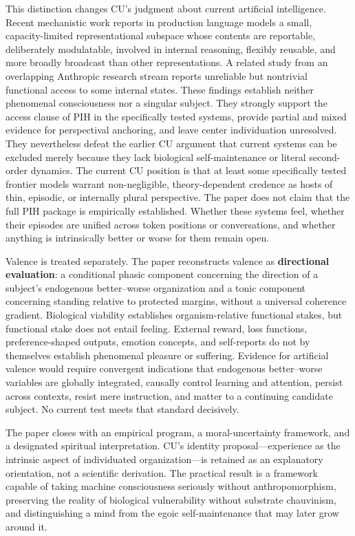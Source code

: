 \documentclass[
  11pt,
]{article}
\begin{document}
This distinction changes CU's judgment about current artificial
intelligence. Recent mechanistic work reports in production language
models a small, capacity-limited representational subspace whose
contents are reportable, deliberately modulatable, involved in internal
reasoning, flexibly reusable, and more broadly broadcast than other
representations. A related study from an overlapping Anthropic research
stream reports unreliable but nontrivial functional access to some
internal states. These findings establish neither phenomenal
consciousness nor a singular subject. They strongly support the access
clause of PIH in the specifically tested systems, provide partial and
mixed evidence for perspectival anchoring, and leave center
individuation unresolved. They nevertheless defeat the earlier CU
argument that current systems can be excluded merely because they lack
biological self-maintenance or literal second-order dynamics. The
current CU position is that at least some specifically tested frontier
models warrant non-negligible, theory-dependent credence as hosts of
thin, episodic, or internally plural perspective. The paper does not
claim that the full PIH package is empirically established. Whether
these systems feel, whether their episodes are unified across token
positions or conversations, and whether anything is intrinsically better
or worse for them remain open.

Valence is treated separately. The paper reconstructs valence as
\textbf{directional evaluation}: a conditional phasic component
concerning the direction of a subject's endogenous better--worse
organization and a tonic component concerning standing relative to
protected margins, without a universal coherence gradient. Biological
viability establishes organism-relative functional stakes, but
functional stake does not entail feeling. External reward, loss
functions, preference-shaped outputs, emotion concepts, and self-reports
do not by themselves establish phenomenal pleasure or suffering.
Evidence for artificial valence would require convergent indications
that endogenous better--worse variables are globally integrated,
causally control learning and attention, persist across contexts, resist
mere instruction, and matter to a continuing candidate subject. No
current test meets that standard decisively.

The paper closes with an empirical program, a moral-uncertainty
framework, and a designated spiritual interpretation. CU's identity
proposal---experience as the intrinsic aspect of individuated
organization---is retained as an explanatory orientation, not a
scientific derivation. The practical result is a framework capable of
taking machine consciousness seriously without anthropomorphism,
preserving the reality of biological vulnerability without substrate
chauvinism, and distinguishing a mind from the egoic self-maintenance
that may later grow around it.
\end{document}
